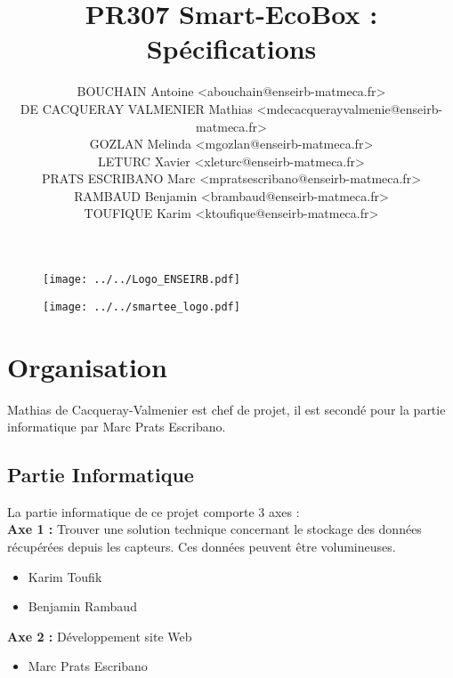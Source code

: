 \documentclass[10pt,a4paper]{article}
\title{PR307 Smart-EcoBox : \\
Spécifications}
\author{
BOUCHAIN Antoine <abouchain@enseirb-matmeca.fr> \\
DE CACQUERAY VALMENIER Mathias <mdecacquerayvalmenie@enseirb-matmeca.fr> \\
GOZLAN Melinda <mgozlan@enseirb-matmeca.fr>\\
LETURC Xavier <xleturc@enseirb-matmeca.fr> \\
PRATS ESCRIBANO Marc <mpratsescribano@enseirb-matmeca.fr> \\
RAMBAUD Benjamin <brambaud@enseirb-matmeca.fr> \\
TOUFIQUE Karim <ktoufique@enseirb-matmeca.fr> \\ }
\begin{document}
\maketitle

\begin{figure}[ht]
\begin{center}
\noindent \texttt{[image: ../../Logo\_ENSEIRB.pdf]}
\end{center}
\end{figure}
\begin{figure}[ht]
\begin{center}
\noindent \texttt{[image: ../../smartee\_logo.pdf]}
\end{center}
\end{figure}


\newpage

\tableofcontents

\newpage

\section{Organisation}
Mathias de Cacqueray-Valmenier est chef de projet, il est secondé pour la partie informatique par Marc Prats Escribano.
\subsection{Partie Informatique}
La partie informatique de ce projet comporte 3 axes :\\
\textbf{Axe 1 :} Trouver une solution technique concernant le stockage des données récupérées depuis les capteurs. Ces
données peuvent être volumineuses.
\begin{itemize}
\item Karim Toufik
\item Benjamin Rambaud
\end{itemize}
\textbf{Axe 2 :} Développement site Web
\begin{itemize}
\item Marc Prats Escribano
\end{itemize}
\end{document}
